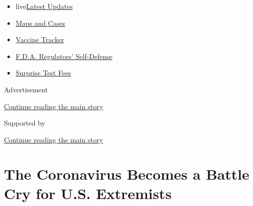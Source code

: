 \begin{itemize}
\tightlist
\item
  live\href{https://www.nytimes3xbfgragh.onion/2020/09/11/world/covid-19-coronavirus.html?name=styln-coronavirus-national\&region=TOP_BANNER\&block=storyline_menu_recirc\&action=click\&pgtype=Article\&impression_id=60dbe171-f4cc-11ea-a1cc-1b2d192d3c31\&variant=undefined}{Latest
  Updates}
\item
  \href{https://www.nytimes3xbfgragh.onion/interactive/2020/us/coronavirus-us-cases.html?name=styln-coronavirus-national\&region=TOP_BANNER\&block=storyline_menu_recirc\&action=click\&pgtype=Article\&impression_id=60dbe172-f4cc-11ea-a1cc-1b2d192d3c31\&variant=undefined}{Maps
  and Cases}
\item
  \href{https://www.nytimes3xbfgragh.onion/interactive/2020/science/coronavirus-vaccine-tracker.html?name=styln-coronavirus-national\&region=TOP_BANNER\&block=storyline_menu_recirc\&action=click\&pgtype=Article\&impression_id=60dc0880-f4cc-11ea-a1cc-1b2d192d3c31\&variant=undefined}{Vaccine
  Tracker}
\item
  \href{https://www.nytimes3xbfgragh.onion/2020/09/10/us/politics/fda-coronavirus-vaccine.html?name=styln-coronavirus-national\&region=TOP_BANNER\&block=storyline_menu_recirc\&action=click\&pgtype=Article\&impression_id=60dc0881-f4cc-11ea-a1cc-1b2d192d3c31\&variant=undefined}{F.D.A.
  Regulators' Self-Defense}
\item
  \href{https://www.nytimes3xbfgragh.onion/2020/09/09/upshot/coronavirus-surprise-test-fees.html?name=styln-coronavirus-national\&region=TOP_BANNER\&block=storyline_menu_recirc\&action=click\&pgtype=Article\&impression_id=60dc0882-f4cc-11ea-a1cc-1b2d192d3c31\&variant=undefined}{Surprise
  Test Fees}
\end{itemize}

Advertisement

\protect\hyperlink{after-top}{Continue reading the main story}

Supported by

\protect\hyperlink{after-sponsor}{Continue reading the main story}

\hypertarget{the-coronavirus-becomes-a-battle-cry-for-us-extremists}{%
\section{The Coronavirus Becomes a Battle Cry for U.S.
Extremists}\label{the-coronavirus-becomes-a-battle-cry-for-us-extremists}}


